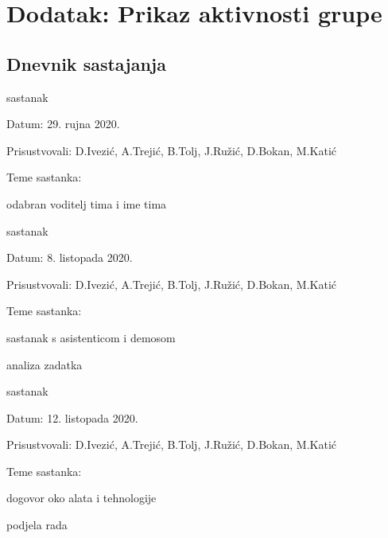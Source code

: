 \chapter*{Dodatak: Prikaz aktivnosti grupe}
		
		\section*{Dnevnik sastajanja}
		
		
		\begin{packed_enum}
			\item  sastanak
			
			\item[] \begin{packed_item}
				\item Datum: 29. rujna 2020.
				\item Prisustvovali: D.Ivezić, A.Trejić, B.Tolj, J.Ružić, D.Bokan, M.Katić
				\item Teme sastanka:
				\begin{packed_item}
					\item  odabran voditelj tima i ime tima
				\end{packed_item}
			\end{packed_item}
			
			\item  sastanak
			\item[] \begin{packed_item}
				\item Datum: 8. listopada 2020.
				\item Prisustvovali: D.Ivezić, A.Trejić, B.Tolj, J.Ružić, D.Bokan, M.Katić
				\item Teme sastanka:
				\begin{packed_item}
					\item  sastanak s asistenticom i demosom
					\item  analiza zadatka
				\end{packed_item}
			\end{packed_item}
			
			\item  sastanak
			\item[] \begin{packed_item}
				\item Datum: 12. listopada 2020.
				\item Prisustvovali: D.Ivezić, A.Trejić, B.Tolj, J.Ružić, D.Bokan, M.Katić
				\item Teme sastanka:
				\begin{packed_item}
					\item  dogovor oko alata i tehnologije
					\item  podjela rada
				\end{packed_item}
			\end{packed_item}
			

\end{packed_enum}
